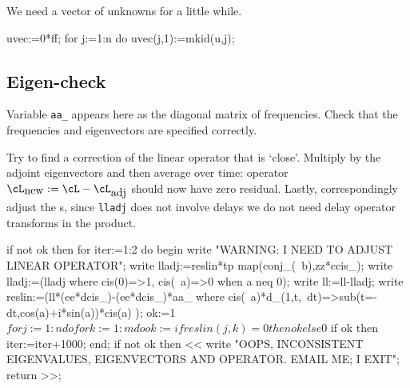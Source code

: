 \documentclass[11pt,a5paper]{article}
\begin{document}
We need a vector of unknowns for a little while.
\begin{reduce}
uvec:=0*ff; %
for j:=1:n do uvec(j,1):=mkid(u,j);
\end{reduce}


\subsection{Eigen-check}

Variable \verb|aa_| appears here as the diagonal matrix of
frequencies. Check that the frequencies and eigenvectors are
specified correctly.

Try to find a correction of the linear operator that is
`close'. Multiply by the adjoint eigenvectors and then
average over time: operator
\(\cL_{\text{new}}:=\cL-\cL_{\text{adj}}\) should now have
zero residual. Lastly, correspondingly adjust the \ode{}s,
since \verb|lladj| does not involve delays we do not need
delay operator transforms in the product.
\begin{reduce}
if not ok then for iter:=1:2 do begin
write "WARNING: I NEED TO ADJUST LINEAR OPERATOR";
write
lladj:=reslin*tp map(conj_(~b),zz*ccis_);
write
lladj:=(lladj where {cis(0)=>1, cis(~a)=>0 when a neq 0});
write
ll:=ll-lladj;
write
reslin:=(ll*(ee*dcis_)-(ee*dcis_)*aa_
    where cis(~a)*d_(1,t,~dt)=>sub(t=-dt,cos(a)+i*sin(a))*cis(a) ); 
ok:=1$
for j:=1:n do for k:=1:m do 
    ok:=if reslin(j,k)=0 then ok else 0$
if ok then iter:=iter+1000;
end;
if not ok then << write
    "OOPS, INCONSISTENT EIGENVALUES, EIGENVECTORS AND OPERATOR.
    EMAIL ME; I EXIT"; 
    return >>;
\end{reduce}
\end{document}
